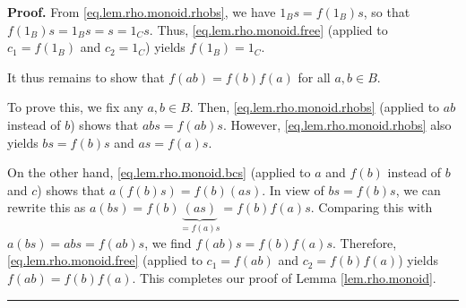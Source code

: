 \documentclass[12pt]{article}
\theoremstyle{definition}%
\theoremstyle{definition}%
\theoremstyle{remark}%
\newcommand{\tup}[1]{\left( #1 \right)}
\newenvironment{proof}[1][Proof]{\noindent\textbf{#1.} }{\ \rule{0.5em}{0.5em}}
\begin{document}
\begin{proof}
From \eqref{eq.lem.rho.monoid.rhobs}, we have $1_{B}s=f\left(  1_{B}\right)
s$, so that $f\left(  1_{B}\right)  s=1_{B}s=s=1_{C}s$. Thus,
\eqref{eq.lem.rho.monoid.free} (applied to $c_{1}=f\left(  1_{B}\right)$ and
$c_{2}=1_{C}$) yields $f\left(  1_{B}\right)  =1_{C}$.

It thus remains to show that $f\tup{ab}  =f\tup{b}   f\left(
a\right)$ for all $a,b\in B$.

To prove this, we fix any $a,b\in B$. Then, \eqref{eq.lem.rho.monoid.rhobs}
(applied to $ab$ instead of $b$) shows that $abs=f\tup{ab}  s$.
However, \eqref{eq.lem.rho.monoid.rhobs} also yields $bs=f\tup{b}   s$
and $as=f\tup{a}   s$.

On the other hand, \eqref{eq.lem.rho.monoid.bcs} (applied to $a$ and $f\left(
b\right)$ instead of $b$ and $c$) shows that $a\left(  f\tup{b} 
s\right)  =f\tup{b}   \left(  as\right)$. In view of $bs=f\left(
b\right)  s$, we can rewrite this as $a\tup{bs}  =f\tup{b} 
\underbrace{\left(  as\right)  }_{=f\tup{a}   s}=f\tup{b} 
f\tup{a}   s$. Comparing this with $a\tup{bs}  =abs=f\left(
ab\right)  s$, we find $f\tup{ab}  s=f\tup{b}   f\left(
a\right)  s$. Therefore, \eqref{eq.lem.rho.monoid.free} (applied to
$c_{1}=f\tup{ab}$ and $c_{2}=f\tup{b}   f\tup{a} 
$) yields $f\tup{ab}  =f\tup{b}   f\tup{a} $. This
completes our proof of Lemma \ref{lem.rho.monoid}.
\end{proof}
\end{document}
